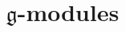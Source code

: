 \documentclass{ximera}
\title{$\mathfrak{g}$-modules}
\begin{document}
\begin{abstract}

\end{abstract}
\maketitle

\end{document}
